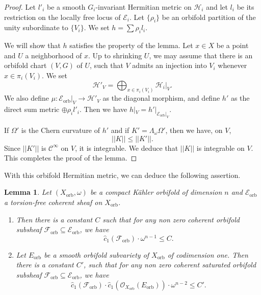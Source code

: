 \documentclass[12pt]{amsart}
\newcommand{\<}{\leq}
\def\mcO{\mathcal{O}}
\def\mcE{\mathcal{E}}
\def\mcF{\mathcal{F}}
\def\mcH{\mathcal{H}}
\def\mcN{\mathcal{N}}
\newtheorem{lemma}[theorem]{Lemma}
\theoremstyle{remark}
\theoremstyle{definition}
\theoremstyle{definition}
\numberwithin{equation}{section}
\theoremstyle{definition}
\theoremstyle{definition}
\def\orb{\mathrm{orb}}
\begin{document}
\begin{proof}


Let $l'_i$  be a smooth $G_i$-invariant Hermitian metric on $\mcH_i$ and let  $l_i$ be its restriction on the locally free locus of $\mcE_i$.  
Let $\{\rho_i\}$ be an orbifold  partition of the unity subordinate to $\{V_i\}$. 
We set $h=\sum \rho_i l_i$.  

We will show that $h$ satisfies the property of the lemma. 
Let $x\in X$ be a point and $U$ a neighborhood of $x$.   
Up to shrinking $U$, we may assume that there is an orbifold chart  $(V,G)$ of $U$, such that $V$  admits  an injection into $V_i$ whenever $x\in \pi_i(V_i)$. 
We set  
\[
\mcH'_V = \bigoplus_{x\in \pi_i(V_i)} \mcH_i|_{V}. 
\]
We also define  $\mu \colon \mcE_{\orb}|_V  \to \mcH'_V$ as the diagonal morphism,  
and define  $h'$ as  the direct sum metric $\oplus \rho_i l'_i$.  
Then we have $h|_V  = h'|_{\mcE_{\orb}|_V}$.


If $\Omega'$ is the Chern curvature of $h'$ and if $K'= \Lambda_\omega \Omega'$, then we have, on $V$,  
\[
||K|| \< ||K'||.
\]
Since $||K'||$  is $\mathcal{C}^{\infty}$ on $V$, it is integrable.  
We deduce that $||K||$ is integrable on $V$. 
This completes the proof of the lemma. 
\end{proof}


With this  orbifold Hermitian metric, we can  deduce the following assertion. 

\begin{lemma}
    \label{lemma:degree-bounded-above} 
Let $(X_{\orb},\omega)$ be a compact K\"ahler orbifold of dimension $n$ and $\mcE_{\orb}$ a  torsion-free coherent sheaf on $X_{\orb}$.  
\begin{enumerate}
    \item Then there is a constant $C$ such that for any non zero  coherent  orbifold subsheaf $\mcF_{\orb} \subseteq \mcE_{\orb}$, we have 
\[ \hat{c}_1( \mcF_{\orb} ) \cdot \omega^{n-1} \< C.\] 
     \item  Let $E_{\orb}$ be a smooth orbifold subvariety of $X_{\orb}$ of codimension one.  
Then there is a constant $C'$,  such that for any non zero coherent saturated orbifold subsheaf $\mcF_{\orb} \subseteq \mcE_{\orb}$, 
we have 
\[ \hat{c}_1( \mcF_{\orb} ) \cdot \hat{c}_1( \mcO_{X_{\orb}}(E_{\orb}) ) \cdot \omega^{n-2} \< C'.\]
\end{enumerate}
\end{lemma}
\end{document}
